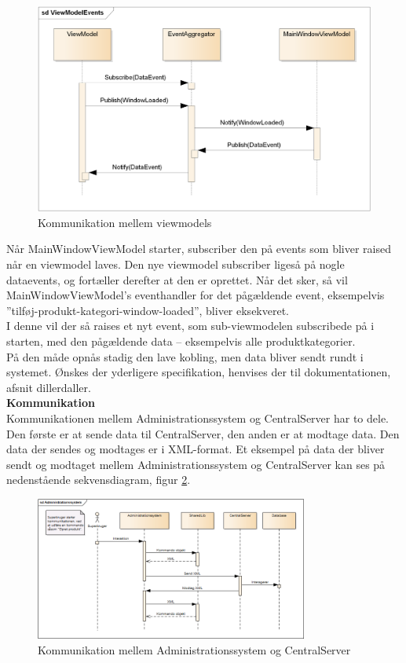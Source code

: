 \begin{figure}[H]
	\centering
	\includegraphics[width=\textwidth]{Projektbeskrivelse/DesignOgImplementering/Images/ViewModelEvents}
	\caption{Kommunikation mellem viewmodels}
	\label{fig:vmcom}
\end{figure}

Når MainWindowViewModel starter, subscriber den på events som bliver raised når en viewmodel laves. Den nye viewmodel subscriber ligeså på nogle dataevents, og fortæller derefter at den er oprettet. Når det sker, så vil MainWindowViewModel’s eventhandler for det pågældende event, eksempelvis ”tilføj-produkt-kategori-window-loaded”, bliver eksekveret.\\
 I denne vil der så raises et nyt event, som sub-viewmodelen subscribede på i starten, med den pågældende data – eksempelvis alle produktkategorier.\\
På den måde opnås stadig den lave kobling, men data bliver sendt rundt i systemet. 
Ønskes der yderligere specifikation, henvises der til dokumentationen, afsnit dillerdaller.\\


\textbf{Kommunikation}\\
Kommunikationen mellem Administrationssystem og CentralServer har to dele. Den første er at sende data til CentralServer, den anden er at modtage data. Den data der sendes og modtages er i XML-format. Et eksempel på data der bliver sendt og modtaget mellem Administrationssystem og CentralServer kan ses på nedenstående sekvensdiagram, figur \ref{fig:adminsekvens}.

\begin{figure}[H]
	\centering
	\includegraphics[width=0.8\textwidth]{Projektbeskrivelse/DesignOgImplementering/Images/Administrationssystem-sekvensdiagram}
	\caption{Kommunikation mellem Administrationssystem og CentralServer}
	\label{fig:adminsekvens}
\end{figure}

